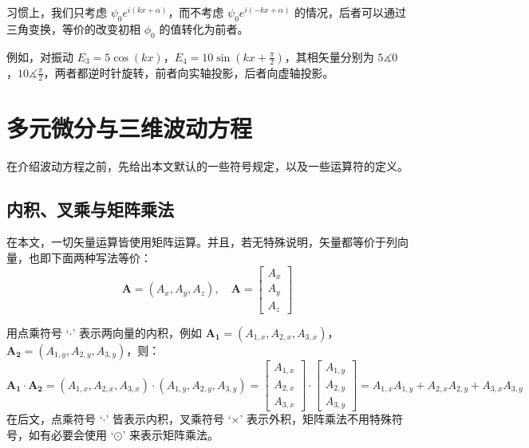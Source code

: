 \documentclass[UTF8]{report}
\theoremstyle{MyLineTheoremStyle} %
\theoremstyle{MyBlockTheoremStyle} %
\theoremstyle{MySubsubsectionStyle} %
\begin{document}
习惯上，我们只考虑 $\psi_0 e^{i(kx + \alpha)}$，而不考虑 $\psi_0 e^{i(-kx + \alpha)}$ 的情况，后者可以通过三角变换，等价的改变初相 $\phi_0$ 的值转化为前者。 

例如，对振动 $E_3 = 5 \cos (kx)$，$E_4 = 10 \sin (kx + \frac{\pi}{2} )$，其相矢量分别为 $5 \measuredangle 0$，$10 \measuredangle \frac{\pi}{2} $，两者都逆时针旋转，前者向实轴投影，后者向虚轴投影。



\section{多元微分与三维波动方程}\label{波动方程}

在介绍波动方程之前，先给出本文默认的一些符号规定，以及一些运算符的定义。

\subsection{内积、叉乘与矩阵乘法}

在本文，一切矢量运算皆使用矩阵运算。并且，若无特殊说明，矢量都等价于列向量，也即下面两种写法等价：
\begin{equation}
    \boldsymbol{A} = (A_x, A_y, A_z),\quad \boldsymbol{A} = \begin{bmatrix} A_x \\ A_y \\ A_z \end{bmatrix}
\end{equation}

用点乘符号 `$\cdot$' 表示两向量的内积，例如 $\boldsymbol{A_1} = (A_{1,x}, A_{2,x}, A_{3,x})$，$\boldsymbol{A_2} = (A_{1,y}, A_{2,y}, A_{3,y})$，则：
\begin{equation}
    \boldsymbol{A_1} \cdot \boldsymbol{A_2} = (A_{1,x}, A_{2,x}, A_{3,x})\cdot (A_{1,y}, A_{2,y}, A_{3,y}) = 
    \begin{bmatrix}
        A_{1,x} \\ A_{2,x} \\ A_{3,x}
    \end{bmatrix}\cdot
    \begin{bmatrix}
        A_{1,y} \\ A_{2,y} \\ A_{3,y}
    \end{bmatrix} =
    A_{1,x}A_{1,y} + A_{2,x}A_{2,y} + A_{3,x}A_{3,y}
\end{equation}
在后文，点乘符号 `$\cdot$' 皆表示内积，叉乘符号 `$\times$' 表示外积，矩阵乘法不用特殊符号，如有必要会使用 `$\odot $' 来表示矩阵乘法。
\end{document}
